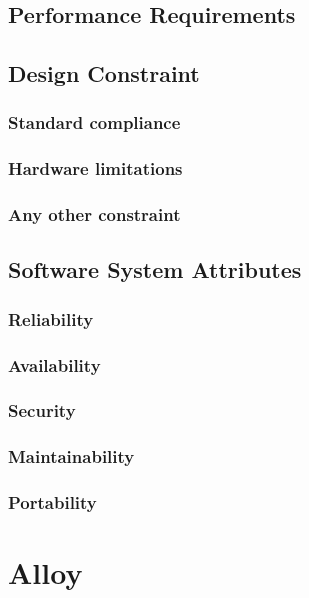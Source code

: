 \documentclass[12pt]{article}
\begin{document}
\subsection{Performance Requirements}

\subsection{Design Constraint}

\subsubsection{Standard compliance}

\subsubsection{Hardware limitations}

\subsubsection{Any other constraint}

\subsection{Software System Attributes}

\subsubsection{Reliability}

\subsubsection{Availability}

\subsubsection{Security}

\subsubsection{Maintainability}

\subsubsection{Portability}

\section{Alloy} %

\end{document}
